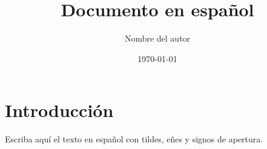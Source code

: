 \documentclass[11pt,a4paper]{article}
\title{Documento en español}
\author{Nombre del autor}
\date{\today}
\begin{document}
\maketitle
\section{Introducción}
Escriba aquí el texto en español con tildes, eñes y signos de apertura.
\end{document}
